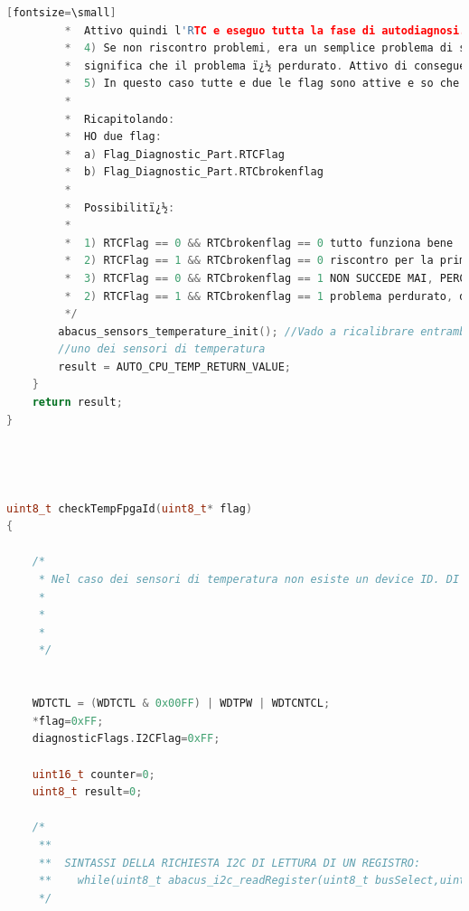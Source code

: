 \documentclass[LaM,binding=0.6cm]{../sapthesis}
\begin{document}
\begin{lstlisting}[language=c][fontsize=\small]
         *  Attivo quindi l'RTC e eseguo tutta la fase di autodiagnosi.
         *  4) Se non riscontro problemi, era un semplice problema di settaggi. Se riscontro nuovamente un problema (bus bloccato, config reg diverso)
         *  significa che il problema ï¿½ perdurato. Attivo di conseguenza la seconda flag (Sensor_broken_flag) e rebootto.
         *  5) In questo caso tutte e due le flag sono attive e so che non devo attivare l'RTC
         *
         *  Ricapitolando:
         *  HO due flag:
         *  a) Flag_Diagnostic_Part.RTCFlag
         *  b) Flag_Diagnostic_Part.RTCbrokenflag
         *
         *  Possibilitï¿½:
         *
         *  1) RTCFlag == 0 && RTCbrokenflag == 0 tutto funziona bene
         *  2) RTCFlag == 1 && RTCbrokenflag == 0 riscontro per la prima volta un problema
         *  3) RTCFlag == 0 && RTCbrokenflag == 1 NON SUCCEDE MAI, PERCHï¿½ IMPONGO CHE LA BROKEN FLAG SIA MODIFICABILE DOPO LA RTC FLAG
         *  2) RTCFlag == 1 && RTCbrokenflag == 1 problema perdurato, devo disattivare l'RTC
         */
        abacus_sensors_temperature_init(); //Vado a ricalibrare entrambi i sensori di temperatura. Potrei anche generare una funzione che calibri soltanto
        //uno dei sensori di temperatura
        result = AUTO_CPU_TEMP_RETURN_VALUE;
    }
    return result;
}




uint8_t checkTempFpgaId(uint8_t* flag)
{

    /*
     * Nel caso dei sensori di temperatura non esiste un device ID. DI conseguenza possiamo controllare soltanto il registro di impostazione
     *
     *
     *
     */


    WDTCTL = (WDTCTL & 0x00FF) | WDTPW | WDTCNTCL;
    *flag=0xFF;
    diagnosticFlags.I2CFlag=0xFF;

    uint16_t counter=0;
    uint8_t result=0;

    /*
     **
     **  SINTASSI DELLA RICHIESTA I2C DI LETTURA DI UN REGISTRO:
     **    while(uint8_t abacus_i2c_readRegister(uint8_t busSelect,uint8_t address, uint8_t reg)
     */


\end{lstlisting}
\end{document}
